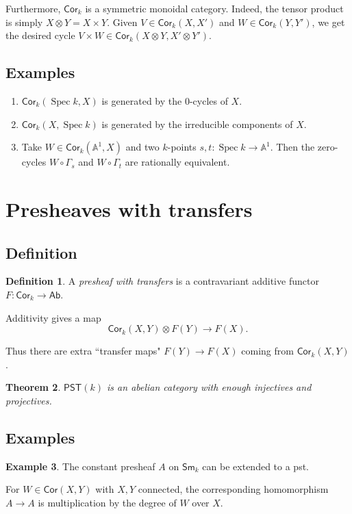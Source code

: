 \documentclass[leqno, openany]{memoir}
\newtheorem{thm}{Theorem}[section]
\theoremstyle{definition}
\newtheorem{defn}[thm]{Definition}
\newtheorem{exm}[thm]{Example}
\theoremstyle{remark}
\theoremstyle{plain}
\theoremstyle{definition}
\theoremstyle{remark}
\newcommand{\A}{\mathbb{A}}
\newcommand{\ms}[1]{\mathsf{#1}}
\newcommand{\Sm}{\mathsf{Sm}}
\newcommand{\Cor}{\mathsf{Cor}}
\DeclareMathOperator{\Spec}{Spec}
\begin{document}
Furthermore, $\Cor_k$ is a symmetric monoidal category.  Indeed, the tensor product is simply $X\otimes Y=X\times Y$.  Given $V\in \Cor_k(X, X')$ and $W\in \Cor_k(Y, Y')$, we get the desired cycle $V\times W\in \Cor_k(X\otimes Y, X'\otimes Y')$. 

\subsection{Examples} 
\begin{enumerate}
\item $\Cor_k(\Spec k, X)$ is generated by the $0$-cycles of $X$. 

\item $\Cor_k(X, \Spec k)$ is generated by the irreducible components of $X$. 

\item Take $W\in \Cor_k(\A^1, X)$ and two $k$-points $s, t:\Spec k\rightarrow \A^1$.  Then the zero-cycles $W\circ \Gamma_s$ and $W\circ \Gamma_t$ are rationally equivalent. 
\end{enumerate}


\section{Presheaves with transfers} 
\subsection{Definition}
\begin{defn}
    A \textit{presheaf with transfers} is a contravariant additive functor $F:\Cor_k\rightarrow\ms{Ab}$.
\end{defn} 

Additivity gives a map 
\[
\Cor_k(X, Y)\otimes F(Y)\rightarrow F(X).
\]

Thus there are extra ``transfer maps" $F(Y)\rightarrow F(X)$ coming from $\Cor_k(X, Y)$. 

\begin{thm}
    $\ms{PST}(k)$ is an abelian category with enough injectives and projectives. 
\end{thm}

\subsection{Examples}

\begin{exm}
The constant presheaf $A$ on $\Sm_k$ can be extended to a pst.  

For $W\in \Cor(X, Y)$ with $X, Y$ connected, the corresponding homomorphism $A\rightarrow A$ is multiplication by the degree of $W$ over $X$. 
\end{exm}
\end{document}
